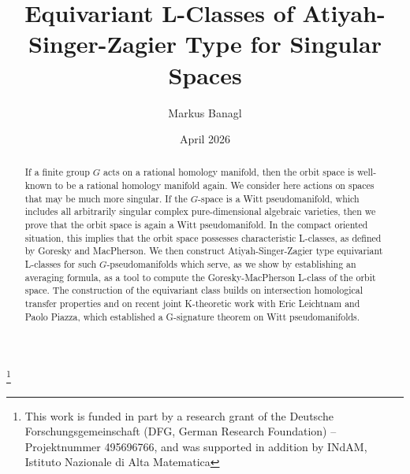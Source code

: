 \documentclass{amsart}
\theoremstyle{definition}
\theoremstyle{remark}
\begin{document}


 
\title[Equivariant L-Classes]
  {Equivariant L-Classes of Atiyah-Singer-Zagier Type for Singular Spaces}

\author{Markus Banagl}

\address{Institut f\"ur Mathematik, Universit\"at Heidelberg,
  Im Neuenheimer Feld 205, 69120 Heidelberg, Germany}


\thanks{This work is funded in part by a research grant of the
 Deutsche Forschungsgemeinschaft (DFG, German Research Foundation)
 -- Projektnummer 495696766, and was supported in addition by
 INdAM, Istituto Nazionale di Alta Matematica}
 

\date{April 2026}







\begin{abstract}
If a finite group $G$ acts on a rational homology manifold, then the orbit space is well-known to be a rational homology manifold again. We consider here actions on spaces that may be much more singular. If the $G$-space is a Witt pseudomanifold, which includes all arbitrarily singular complex pure-dimensional algebraic varieties, then we prove that the orbit space is again a Witt pseudomanifold. In the compact oriented situation, this implies that the orbit space possesses characteristic L-classes, as defined by Goresky and MacPherson. 
We then construct Atiyah-Singer-Zagier type equivariant L-classes 
for such $G$-pseudomanifolds
which serve, as we show by establishing an averaging formula,
as a tool to compute the Goresky-MacPherson
L-class of the orbit space. The construction of the equivariant class builds on intersection homological transfer properties and on recent joint K-theoretic work with Eric Leichtnam and Paolo Piazza, which established a G-signature theorem on Witt pseudomanifolds.
\end{abstract}
\end{document}
